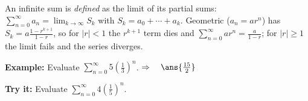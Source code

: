 \documentclass[12pt]{article}
\begin{document}

\begin{formulabox}
An infinite sum is \emph{defined} as the limit of its partial sums:
$\sum_{n=0}^{\infty}a_n=\lim_{k\to\infty}S_k$ with $S_k=a_0+\cdots+a_k$.
Geometric ($a_n=ar^n$) has $S_k=a\frac{1-r^{k+1}}{1-r}$, so for $|r|<1$ the
$r^{k+1}$ term dies and $\sum_{n=0}^{\infty}ar^n=\frac{a}{1-r}$; for $|r|\ge1$
the limit fails and the series diverges.
\end{formulabox}

\begin{examplebox}
\textbf{Example:} Evaluate
$\displaystyle\sum_{n=0}^{\infty}5\left(\tfrac{1}{3}\right)^{n}$.
$\Rightarrow\quad \ans{\tfrac{15}{2}}$
\end{examplebox}

\begin{tryitbox}
\textbf{Try it:} Evaluate
$\displaystyle\sum_{n=0}^{\infty}4\left(\tfrac{1}{5}\right)^{n}$.\\[2pt]
\end{tryitbox}
\end{document}
